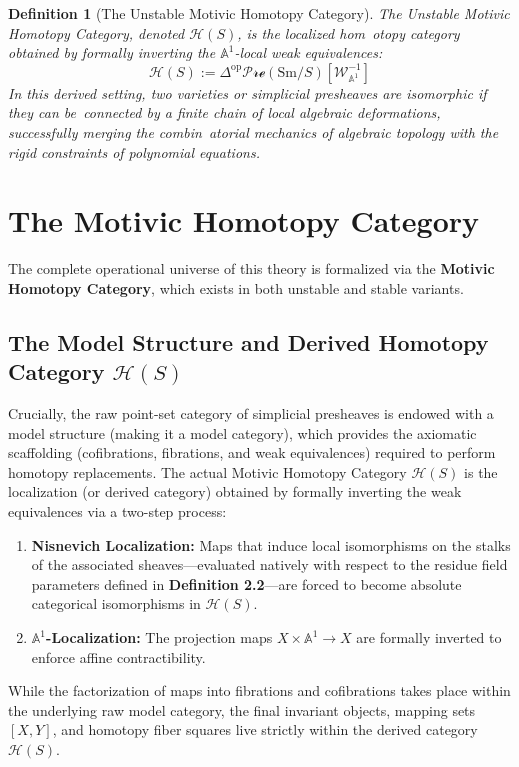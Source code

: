 \documentclass[11pt,oneside]{article}
\newtheorem{definition}{Definition}[section]
\begin{document}
\begin{definition}[The Unstable Motivic Homotopy Category]
The \emph{Unstable Motivic Homotopy Category}, denoted $\mathcal{H}(S)$, is the localized hom\
otopy category obtained by formally inverting the $\mathbb{A}^1$-local weak equivalences:
\[ \mathcal{H}(S) := \Delta^{\text{op}}\mathcal{Pre}(\text{Sm}/S)
[\mathcal{W}_{\mathbb{A}^1}^{-1}] \]
In this derived setting, two varieties or simplicial presheaves are isomorphic if they can be\
 connected by a finite chain of local algebraic deformations, successfully merging the combin\
atorial mechanics of algebraic topology with the rigid constraints of polynomial equations.
\end{definition}


\section{The Motivic Homotopy Category}
The complete operational universe of this theory is formalized via the \textbf{Motivic Homotopy Category}, which exists in both unstable and stable variants.

\subsection{The Model Structure and Derived Homotopy Category $\mathcal{H}(S)$}
Crucially, the raw point-set category of simplicial presheaves is endowed with a model structure (making it a model category), which provides the axiomatic scaffolding (cofibrations, fibrations, and weak equivalences) required to perform homotopy replacements. The actual Motivic Homotopy Category $\mathcal{H}(S)$ is the localization (or derived category) obtained by formally inverting the weak equivalences via a two-step process:
\begin{enumerate}
    \item \textbf{Nisnevich Localization:} Maps that induce local isomorphisms on the stalks of the associated sheaves—evaluated natively with respect to the residue field parameters defined in \textbf{Definition 2.2}—are forced to become absolute categorical isomorphisms in $\mathcal{H}(S)$.
    \item \textbf{$\mathbb{A}^1$-Localization:} The projection maps $X \times \mathbb{A}^1 \to X$ are formally inverted to enforce affine contractibility.
\end{enumerate}

While the factorization of maps into fibrations and cofibrations takes place within the underlying raw model category, the final invariant objects, mapping sets $[X, Y]$, and homotopy fiber squares live strictly within the derived category $\mathcal{H}(S)$.
\end{document}

